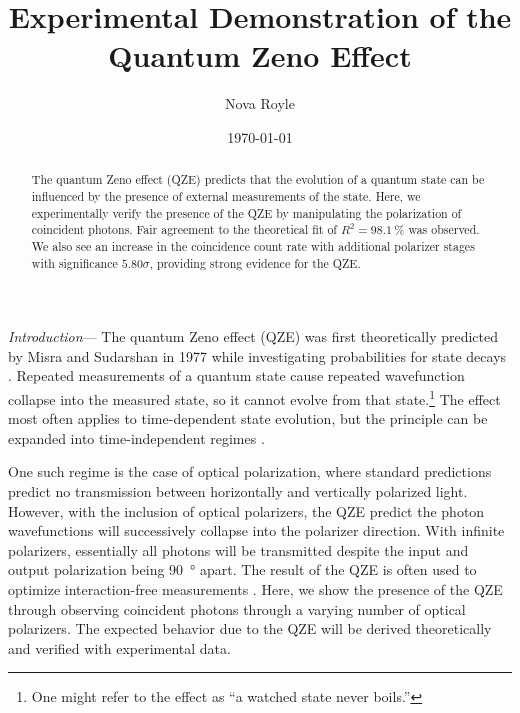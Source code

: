 \documentclass[%
reprint,
superscriptaddress,
nofootinbib,
nobibnotes,
nobalancelastpage,
amsmath,amssymb,
aps, 
prl,
floatfix,
]{revtex4-2}
\renewcommand{\section}[1]{\textit{#1}---\ignorespaces}
\begin{document}
\title{Experimental Demonstration of the Quantum Zeno Effect}

\author{Nova Royle}


\date{\today}

\begin{abstract}
The quantum Zeno effect (QZE) predicts that the evolution of a quantum state can be influenced by the presence of external measurements of the state. Here, we experimentally verify the presence of the QZE by manipulating the polarization of coincident photons. Fair agreement to the theoretical fit of $R^2=\qty{98.1}{\percent}$ was observed. We also see an increase in the coincidence count rate with additional polarizer stages with significance $\qty{5.80}\sigma$, providing strong evidence for the QZE.
\end{abstract}

\maketitle

\section{Introduction}
The quantum Zeno effect (QZE) was first theoretically predicted by Misra and Sudarshan in 1977 while investigating probabilities for state decays \cite{misraZenosParadoxQuantum1977}. Repeated measurements of a quantum state cause repeated wavefunction collapse into the measured state, so it cannot evolve from that state.\footnote{One might refer to the effect as ``a watched state never boils.''} The effect most often applies to time-dependent state evolution, but the principle can be expanded into time-independent regimes \cite{peresZenoParadoxQuantum1980}. 

One such regime is the case of optical polarization, where standard predictions predict no transmission between horizontally and vertically polarized light. However, with the inclusion of optical polarizers, the QZE predict the photon wavefunctions will successively collapse into the polarizer direction. With infinite polarizers, essentially all photons will be transmitted despite the input and output polarization being \qty{90}{\degree} apart. The result of the QZE is often used to optimize interaction-free measurements \cite{kwiatExperimentalRealizationInteractionfree1995,kwiatQuantumSeeingDark1996}. Here, we show the presence of the QZE through observing coincident photons through a varying number of optical polarizers. The expected behavior due to the QZE will be derived theoretically and verified with experimental data.
\end{document}
